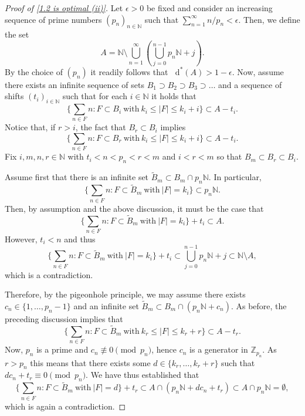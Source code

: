 \documentclass[letter, 11pt]{article}
\theoremstyle{definition}
\theoremstyle{plain}
\newcommand{\N}{\mathbb{N}}
\newcommand{\Z}{\mathbb{Z}}
\newcommand*\diff{\mathop{}\!\mathrm{d}}
\newcommand{\1}{\mathbbm{1}}
\begin{document}
\begin{proof}[Proof of \cref{1.2 is optimal (ii)}]
Let $\epsilon>0$ be fixed and consider an increasing sequence of prime numbers $(p_n)_{n\in \N}$ such that $\sum_{n=1}^{\infty} n/p_n <\epsilon.$ Then, we define the set 
\begin{equation} \label{eq set counterex}
    A=\N \setminus \bigcup_{n=1}^{\infty} \left( \bigcup_{j=0}^{n-1}p_n\N + j \right).
\end{equation}
By the choice of $(p_n)$ it readily follows that $\diff^*(A)>1-\epsilon$. Now, assume there exists an infinite sequence of sets $B_1 \supset B_2 \supset B_3 \supset \dots$ and a sequence of shifts $(t_i)_{i\in \N}$ such that for each $i\in \N$ it holds that
$$ \bigg\{\sum_{n\in F}n: F\subset B_i\ \text{with}\ k_i\leq |F|\leq k_i+i \bigg\} \subset A-t_i.$$
Notice that, if $r>i$, the fact that $B_{r} \subset B_i$ implies
$$\bigg\{\sum_{n\in F}n: F\subset B_r\ \text{with}\ k_i\leq |F|\leq k_i+i \bigg\} \subset A-t_i.$$
Fix $i,m,n,r\in \N$ with $t_{i}<n<p_n<r<m$ and $i<r<m$ so that $B_m \subset B_{r} \subset B_{i}$.

Assume first that there is an infinite set $\tilde{B}_m\subset B_m \cap  p_n\N$. In particular, $$\bigg\{\sum_{n\in F}n: F\subset \tilde{B}_m\ \text{with}\  |F|= k_i \bigg\} \subset p_n \N.$$  Then, by assumption and the above 
discussion, it must be the case that 
$$\bigg\{\sum_{n\in F}n: F\subset \tilde{B}_m\ \text{with}\  |F|= k_i \bigg\}+t_{i} \subset A.$$
However, $t_{i}<n$ and thus 
$$\bigg\{\sum_{n\in F}n: F\subset \tilde{B}_m\ \text{with}\  |F|= k_i \bigg\}+t_{i}  \subset \bigcup_{j=0}^{n-1} p_n\N + j \subset \N\setminus A,$$
which is a contradiction. 

Therefore, by the pigeonhole principle, we may assume there exists $c_n\in \{1,\ldots,p_n-1\}$ and an infinite set $\tilde{B}_{m} \subset B_m \cap (p_n\N+c_n)$. As before, the preceding discussion implies that
$$\bigg\{\sum_{n\in F}n: F\subset \tilde{B}_m\ \text{with}\ k_r\leq |F|\leq k_r+r \bigg\} \subset A-t_{r}.$$
Now, $p_n$ is a prime and $c_n \not\equiv 0 \pmod {p_n}$, hence $c_n$ is a generator in $\Z_{p_n}$. As $r>p_n$ this means that there exists some $d\in \{k_{r},\ldots,k_{r}+r\}$ such that $dc_n+t_{r} \equiv 0 \pmod{p_n}.$ 
We have thus established that 
$$\bigg\{\sum_{n\in F}n: F\subset \tilde{B}_m\ \text{with}\ |F|=d \bigg\}+t_r \subset A \cap \left(p_n\N + d c_n+t_{r}\right) \subset A \cap p_n\N = \emptyset,$$
which is again a contradiction. 
\end{proof}
\end{document}

